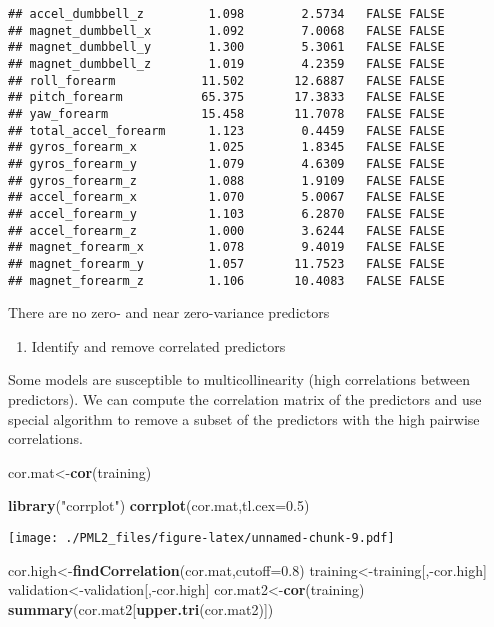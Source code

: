 \documentclass[]{article}
\newenvironment{Shaded}{\begin{snugshade}}{\end{snugshade}}
\newcommand{\KeywordTok}[1]{\textcolor[rgb]{0.13,0.29,0.53}{\textbf{{#1}}}}
\newcommand{\DataTypeTok}[1]{\textcolor[rgb]{0.13,0.29,0.53}{{#1}}}
\newcommand{\FloatTok}[1]{\textcolor[rgb]{0.00,0.00,0.81}{{#1}}}
\newcommand{\StringTok}[1]{\textcolor[rgb]{0.31,0.60,0.02}{{#1}}}
\newcommand{\NormalTok}[1]{{#1}}
\begin{document}
\begin{verbatim}
## accel_dumbbell_z         1.098        2.5734   FALSE FALSE
## magnet_dumbbell_x        1.092        7.0068   FALSE FALSE
## magnet_dumbbell_y        1.300        5.3061   FALSE FALSE
## magnet_dumbbell_z        1.019        4.2359   FALSE FALSE
## roll_forearm            11.502       12.6887   FALSE FALSE
## pitch_forearm           65.375       17.3833   FALSE FALSE
## yaw_forearm             15.458       11.7078   FALSE FALSE
## total_accel_forearm      1.123        0.4459   FALSE FALSE
## gyros_forearm_x          1.025        1.8345   FALSE FALSE
## gyros_forearm_y          1.079        4.6309   FALSE FALSE
## gyros_forearm_z          1.088        1.9109   FALSE FALSE
## accel_forearm_x          1.070        5.0067   FALSE FALSE
## accel_forearm_y          1.103        6.2870   FALSE FALSE
## accel_forearm_z          1.000        3.6244   FALSE FALSE
## magnet_forearm_x         1.078        9.4019   FALSE FALSE
## magnet_forearm_y         1.057       11.7523   FALSE FALSE
## magnet_forearm_z         1.106       10.4083   FALSE FALSE
\end{verbatim}

There are no zero- and near zero-variance predictors

\begin{enumerate}
\def\labelenumi{\arabic{enumi}.}
\setcounter{enumi}{3}
\itemsep1pt\parskip0pt
\item
  Identify and remove correlated predictors
\end{enumerate}

Some models are susceptible to multicollinearity (high correlations
between predictors). We can compute the correlation matrix of the
predictors and use special algorithm to remove a subset of the
predictors with the high pairwise correlations.

\begin{Shaded}
\begin{Highlighting}[]
\NormalTok{cor.mat<-}\KeywordTok{cor}\NormalTok{(training)}

\KeywordTok{library}\NormalTok{(}\StringTok{"corrplot"}\NormalTok{)}
\KeywordTok{corrplot}\NormalTok{(cor.mat,}\DataTypeTok{tl.cex=}\FloatTok{0.5}\NormalTok{)}
\end{Highlighting}
\end{Shaded}

\texttt{[image: ./PML2\_files/figure-latex/unnamed-chunk-9.pdf]}

\begin{Shaded}
\begin{Highlighting}[]
\NormalTok{cor.high<-}\KeywordTok{findCorrelation}\NormalTok{(cor.mat,}\DataTypeTok{cutoff=}\FloatTok{0.8}\NormalTok{)}
\NormalTok{training<-training[,-cor.high]}
\NormalTok{validation<-validation[,-cor.high]}
\NormalTok{cor.mat2<-}\KeywordTok{cor}\NormalTok{(training)}
\KeywordTok{summary}\NormalTok{(cor.mat2[}\KeywordTok{upper.tri}\NormalTok{(cor.mat2)])}
\end{Highlighting}
\end{Shaded}
\end{document}
